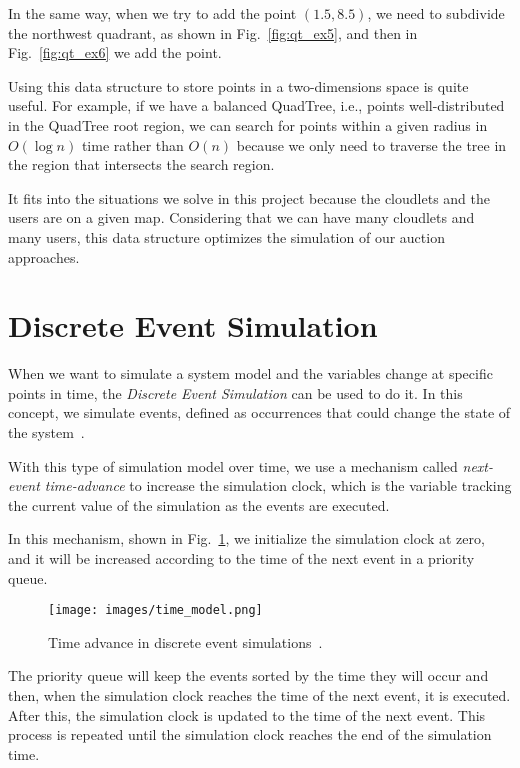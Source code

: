 \documentclass[English]{ic-tese-v3}
\begin{document}
In the same way, when we try to add the point $(1.5, 8.5)$, we need to subdivide the northwest quadrant, as shown in Fig.~\ref{fig:qt_ex5}, and then in Fig.~\ref{fig:qt_ex6} we add the point.

Using this data structure to store points in a two-dimensions space is quite useful. For example, if we have a balanced QuadTree, i.e., points well-distributed in the QuadTree root region, we can search for points within a given radius in $O(\log n)$ time rather than $O(n)$ because we only need to traverse the tree in the region that intersects the search region.

It fits into the situations we solve in this project because the cloudlets and the users are on a given map. Considering that we can have many cloudlets and many users, this data structure optimizes the simulation of our auction approaches.

\section{Discrete Event Simulation}
\label{sec:des}
When we want to simulate a system model and the variables change at specific points in time, the \emph{Discrete Event Simulation} can be used to do it. In this concept, we simulate events, defined as occurrences that could change the state of the system~\cite{AverilSim2014}.

With this type of simulation model over time, we use a mechanism called \emph{next-event time-advance} to increase the simulation clock, which is the variable tracking the current value of the simulation as the events are executed. 

In this mechanism, shown in Fig.~\ref{fig:time-advance}, we initialize the simulation clock at zero, and it will be increased according to the time of the next event in a priority queue.
\begin{figure}[h]
    \centering
    \texttt{[image: images/time\_model.png]}
    \caption{Time advance in discrete event simulations~\cite{AverilSim2014}.}
    \label{fig:time-advance}
\end{figure}

The priority queue will keep the events sorted by the time they will occur and then, when the simulation clock reaches the time of the next event, it is executed. After this, the simulation clock is updated to the time of the next event. This process is repeated until the simulation clock reaches the end of the simulation time.
\end{document}
